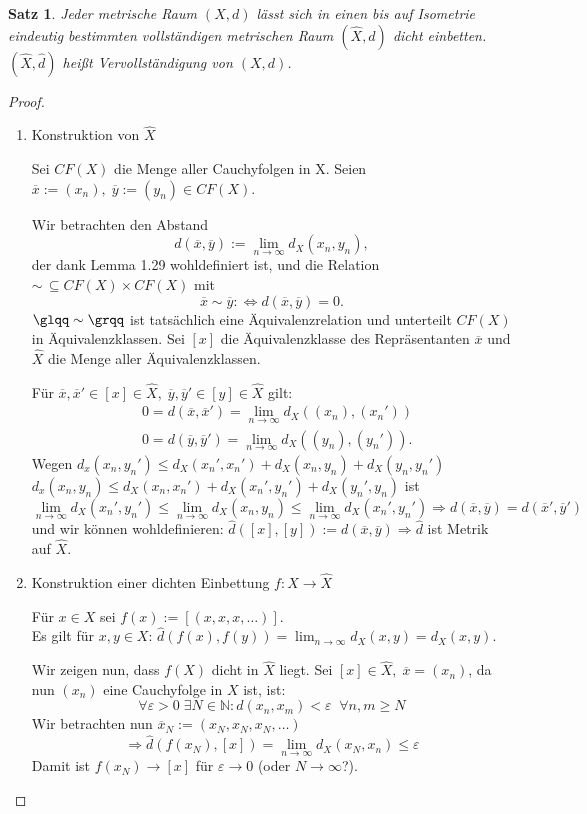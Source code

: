 \documentclass[ngerman]{report}
\theoremstyle{plain}%
\newtheorem{thm}{Satz}[chapter]
\theoremstyle{definition}%
\theoremstyle{myStyle}
\newcommand{\N}{\mathbb{N}}
\newcommand{\dX}{\hat{X}}%
\newcommand{\dd}{\hat{d}}%
\newcommand{\olx}{\overline{x}} %
\newcommand{\oly}{\overline{y}}
\newcommand{\df}[1][]{%
	\overset{#1}{\Rightarrow}
}
\begin{document}
\begin{thm}%
Jeder metrische Raum $(X,d)$ lässt sich in einen bis auf Isometrie eindeutig bestimmten vollständigen metrischen Raum $(\dX,\dd)$ dicht einbetten. $(\dX,\dd)$ heißt Vervollständigung von $(X,d)$.
\end{thm}
\begin{proof}
\begin{enumerate}[(1)]
\item Konstruktion von $\dX$\par
Sei $CF(X)$ die Menge aller Cauchyfolgen in X. Seien $\overline{x}:=(x_n),\;\overline{y}:=(y_n) \in CF(X)$.\par 
Wir betrachten den \glqq Abstand\grqq  $$ d(\overline{x},\overline{y}):=\lim_{n\to\infty} d_X(x_n,y_n),$$ der dank Lemma 1.29 wohldefiniert ist,
und die Relation $\sim\, \subseteq CF(X) \times CF(X)$ mit
$$\overline{x} \sim \overline{y} :\Leftrightarrow d(\olx,\oly) = 0.$$
$\glqq \sim \grqq$ ist tatsächlich eine Äquivalenzrelation und unterteilt $CF(X)$ in Äquivalenzklassen. Sei $[x]$ die Äquivalenzklasse des Repräsentanten $\olx$ und $\dX$ die Menge aller Äquivalenzklassen.\par 
Für $\olx,\olx'\in [x]\in \dX,\;\oly,\oly'\in [y]\in\dX$ gilt: 
\begin{equation*}
\begin{split}
& 0=d(\olx,\olx') = \lim_{n\to \infty} d_X((x_n),(x_n'))\\
& 0=d(\oly,\oly') = \lim_{n\to \infty} d_X((y_n),(y_n')).
\end{split}
\end{equation*}
Wegen $d_x(x_n,y_n') \leq d_X(x_n',x_n')+d_X(x_n,y_n)+d_X(y_n,y_n')$\\
$d_x(x_n,y_n) \leq d_X(x_n,x_n')+d_X(x_n',y_n')+d_X(y_n',y_n)$ ist
$$\lim_{n\to\infty} d_X(x_n',y_n')\leq \lim_{n\to\infty} d_X(x_n,y_n) \leq \lim_{n\to\infty} d_X(x_n',y_n')\df d(\olx,\oly)=d(\olx',\oly')$$
und wir können 	wohldefinieren: $\dd([x],[y]):=d(\olx,\oly)\df \dd$ ist Metrik auf $\dX$.

\item Konstruktion einer dichten Einbettung $f:X\to \dX$\par
Für $x\in X$ sei $f(x):=[(x,x,x,\dots)]$.\\
Es gilt für $x,y\in X$: $\dd(f(x),f(y)) = \lim_{n\to\infty}d_X(x,y)=d_X(x,y)$.\par 
Wir zeigen nun, dass $f(X)$ dicht in $\dX$ liegt. Sei $[x]\in\dX,\;\olx=(x_n)$, da nun $(x_n)$ eine Cauchyfolge in $X$ ist, ist:
$$\forall \varepsilon >0\; \exists N\in\N : d(x_n,x_m)< \varepsilon \;\;\forall n,m \geq N$$
Wir betrachten nun $\olx_N := (x_N,x_N,x_N,\dots)$ $$\df \dd(f(x_N),[x])=\lim_{n\to\infty} d_X(x_N,x_n)\leq \varepsilon$$ 
Damit ist $f(x_N)\to [x]$ für $\varepsilon \to 0$ (oder $N\to\infty$?).


\end{enumerate}
\end{proof}
\end{document}
